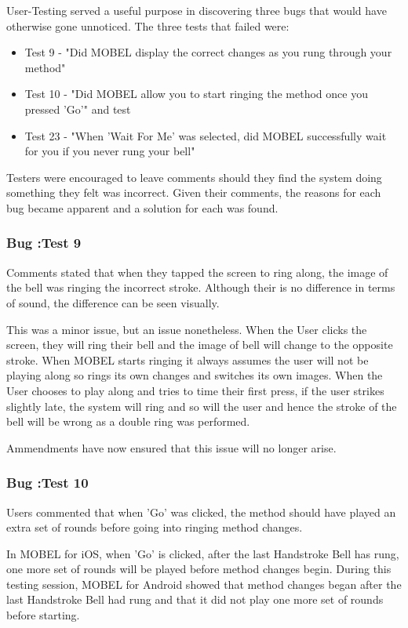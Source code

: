 \documentclass{l4proj}
\begin{document}
User-Testing served a useful purpose in discovering three bugs that would have otherwise gone unnoticed. The three tests that failed were: \begin{itemize}
\item Test 9 - "Did MOBEL display the correct changes as you rung through your method"
\item Test 10 - "Did MOBEL allow you to start ringing the method once you pressed 'Go'" and test 
\item Test 23 - "When 'Wait For Me' was selected, did MOBEL successfully wait for you if you never rung your bell"
\end{itemize} 

Testers were encouraged to leave comments should they find the system doing something they felt was incorrect.  Given their comments, the reasons for each bug became apparent and a solution for each was found.

\subsubsection{Bug :Test 9}
Comments stated that when they tapped the screen to ring along, the image of the bell was ringing the incorrect stroke.  Although their is no difference in terms of sound, the difference can be seen visually.

This was a minor issue, but an issue nonetheless. When the User clicks the screen, they will ring their bell and the image of bell will change to the opposite stroke.  When MOBEL starts ringing it always assumes the user will not be playing along so rings its own changes and switches its own images.  When the User chooses to play along and tries to time their first press, if the user strikes slightly late, the system will ring and so will the user and hence the stroke of the bell will be wrong as a double ring was performed.

Ammendments have now ensured that this issue will no longer arise. 
\subsubsection{Bug :Test 10}
Users commented that when 'Go' was clicked, the method should have played an extra set of rounds before going into ringing method changes.

In MOBEL for iOS, when 'Go' is clicked, after the last Handstroke Bell has rung, one more set of rounds will be played before method changes begin.  During this testing session, MOBEL for Android showed that method changes began after the last Handstroke Bell had rung and that it did not play one more set of rounds before starting. 
\end{document}
